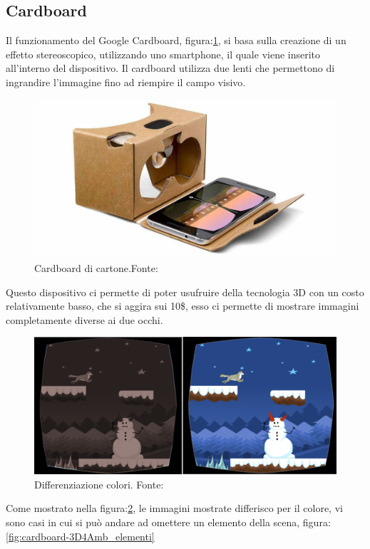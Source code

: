 \documentclass[
a4paper,
cleardoublepage=empty,
headings=twolinechapter,
numbers=autoenddot,
]{scrbook}
\begin{document}
	\subsection{Cardboard}\label{chap:cardboard}
	Il funzionamento del Google Cardboard, figura:\ref{fig:cardboard}, si basa sulla creazione di un effetto stereoscopico\cite{Stereoscopio}, utilizzando uno smartphone, il quale viene inserito all'interno del dispositivo.
	Il cardboard utilizza due lenti che permettono di ingrandire l'immagine fino ad riempire il campo visivo\cite{Funzionamento_cardboard}.
	\begin{figure}[H]
		\centering
		\includegraphics[width=0.8\linewidth]{image/cardboard}
		\caption{Cardboard di cartone.Fonte:\cite{Cardboard_image}}
		\label{fig:cardboard}
	\end{figure}
	Questo dispositivo ci permette di poter usufruire della tecnologia 3D con un costo relativamente basso, che si aggira sui 10\$, esso ci permette di mostrare immagini completamente diverse ai due occhi.
	\begin{figure}[H]
		\centering
		\includegraphics[width=0.8\linewidth]{image/3D4Amb_1}
		\caption{Differenziazione colori.
			Fonte:\cite{3d4amb}}
		\label{fig:cardboard-3D4Amb_colori}
	\end{figure}
	Come mostrato nella figura:\ref{fig:cardboard-3D4Amb_colori}, le immagini mostrate differisco per il colore, vi sono casi in cui si può andare ad omettere un elemento della scena, figura:\ref{fig:cardboard-3D4Amb_elementi}
\end{document}
